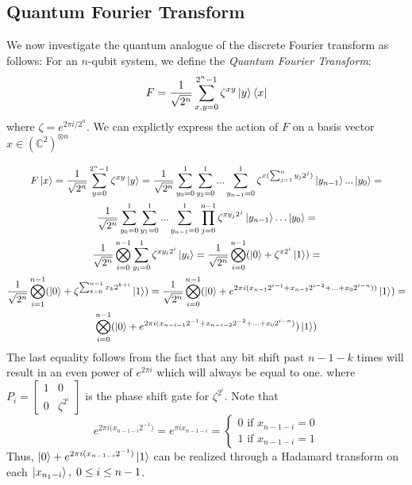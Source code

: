 \documentclass{../quantum.tex}
\begin{document}
\subsection{Quantum Fourier Transform}

We now investigate the quantum analogue of the discrete Fourier transform as follows:
%
For an $n$-qubit system, we define the \textit{Quantum Fourier Transform}:
%
$$ F = \frac{1}{\sqrt{2^n}} \sum_{x,y = 0}^{2^n-1} \zeta^{xy} \ket{y}\bra{x} $$
 where $\zeta = e^{2\pi i /2^n} $. We can explictly express the action of $F$ on a basis vector $x \in (\mathbb{C}^2)^{\otimes n}$

\begin{gather*}
  F\ket{x} = \frac{1}{\sqrt{2^n}} \sum_{y=0}^{2^n-1} \zeta^{xy} \ket{y} = \frac{1}{\sqrt{2^n}} \sum_{y_0=0}^{1}\sum_{y_2=0}^{1}...\sum_{y_{n-1}=0}^{1} \zeta^{x(\sum_{j=1}^n y_j2^j)} \ket{y_{n-1}} ...\ket{y_0} = \\
  \frac{1}{\sqrt{2^n}} \sum_{y_0=0}^{1}\sum_{y_1=0}^{1}...\sum_{y_{n-1}=0}^{1} \prod_{j=0}^{n-1} \zeta^{xy_j2^j} \ket{y_{n-1}} \ldots \ket{y_0} = \\
  \frac{1}{\sqrt{2^n}} \bigotimes_{i=0}^{n-1}\sum_{y_i=0}^1 \zeta^{xy_i2^i} \ket{y_i} = \frac{1}{\sqrt{2^n}} \bigotimes_{i=0}^{n-1}(\ket{0} + \zeta^{x2^i}\ket{1}) = \\
  \frac{1}{\sqrt{2^n}} \bigotimes_{i=1}^{n-1}(\ket{0} + \zeta^{\sum_{k=0}^{n-1} x_k2^{k+i}}\ket{1}) = \frac{1}{\sqrt{2^n}} \bigotimes_{i=0}^{n-1} (\ket{0} + e^{2\pi i(x_{n-1}2^{i-1} +x_{n-2}2^{i-2} + \ldots + x_{0} 2^{i-n}))}\ket{1}) = \\
  \bigotimes_{i=0}^{n-1} (\ket{0} + e^{2\pi i(x_{n- i - 1}2^{-1} +x_{n- i - 2}2^{-2} + \ldots + x_{0} 2^{i-n})})\ket{1})
\end{gather*}
%
The last equality follows from the fact that any bit shift past $n-1-k$ times will result in an even power of $e^{2\pi i}$ which will always be equal to one.
where $P_i = \left[\begin{matrix} 1 & 0 \\ 0 & \zeta^{2^i} \end{matrix}\right]$ is the phase shift gate for $\zeta^{2^i}$. Note that
%
$$ e^{2\pi i(x_{n-1-i}{2^{-1})}} = e^{\pi i x_{n-1 - i}} =
\begin{cases}
0 \text{ if } x_{n - 1 - i} = 0 \\
1 \text{ if } x_{n - 1 - i} = 1
\end{cases}
$$
%
Thus, $\ket{0} + e^{2\pi i(x_{n-1-i}{2^{-1})}}\ket{1}$ can be realized through a Hadamard transform on each $\ket{x_{n_ 1- i}}, \newline \; 0 \leq i \leq n-1$.
\end{document}
